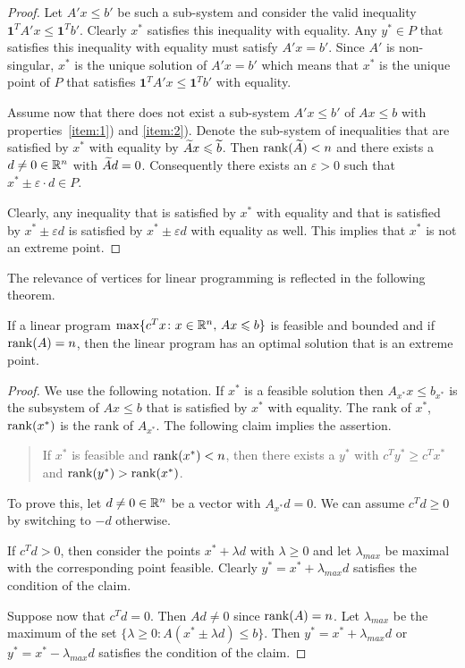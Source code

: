 \begin{proof}
  Let $A'x \leq b'$ be such a sub-system and consider the valid
  inequality $\mathbf{1}^T A' x \leq \mathbf{1}^T b'$.  Clearly $x^*$
  satisfies this inequality with equality. Any $y^* \in P$ that
  satisfies this inequality with equality must satisfy $A'x = b'$.
  Since $A'$ is non-singular, $x^*$ is the unique solution of $A'x =
  b'$ which means that $x^*$ is the unique point of $P$ that satisfies
  $\mathbf{1}^T A' x \leq \mathbf{1}^T b'$ with equality. 

  Assume now that there does not exist a sub-system $A'x \leq b'$ of
  $Ax \leq b$ with properties~\ref{item:1}) and \ref{item:2}). Denote
  the sub-system of inequalities that are satisfied by $x^*$ with
  equality by $\widetilde{A}x \leqslant \widetilde{b}$. Then $\mathrm{rank}(\widetilde{A}) < n$ and
  there exists a $d \neq 0 \in \mathbb{R}^n$ with $\widetilde{A}d = 0$. Consequently
  there exists an $\varepsilon >0$ such that $x^* \pm \varepsilon
  \cdot d \in P$.

  Clearly, any inequality that is satisfied by $x^*$ with equality and
  that is satisfied by $x^* \pm\varepsilon d$ is satisfied by $x^*
  \pm\varepsilon d$ with equality as well. This implies that $x^*$ is
  not an extreme point.
 
\end{proof}



The relevance of vertices for linear programming is reflected in the following theorem. 

\begin{theorem}
  \label{thr:2}
  If a linear program $\max\{c^Tx \colon x \in \mathbb{R}^n, \, Ax \leqslant b\}$
  is feasible and bounded and if $\mathrm{rank}(A) = n$, then the linear program has an optimal solution that is  an extreme point. 
\end{theorem}


\begin{proof}
  We use the following notation. If $x^*$ is a feasible solution then
  $A_{x^*} x \leq b_{x^*}$ is the subsystem of $Ax \leq b$ that is
  satisfied by $x^*$ with equality. The rank of $x^*$, $\mathrm{rank}(x^*)$ is
  the rank of $A_{x^*}$.  The following claim implies the assertion. 
  \begin{quote}
    If $x^*$ is feasible and $\mathrm{rank}(x^*) < n$, then there exists a
    $y^*$ with $c^T y^* \geq c^Tx^*$ and $\mathrm{rank}(y^*)>\mathrm{rank}(x^*)$.
  \end{quote}
  To prove this, let $d \neq 0 \in \mathbb{R}^n$ be a vector with $A_{x^*}d =
  0$.  We can assume $c^Td \geq 0$ by switching to $-d$ otherwise.

  If $c^Td >0$, then consider the points $x^* + \lambda d$ with
  $\lambda \geq 0$ and let $\lambda_{max}$ be maximal with the
  corresponding point feasible. Clearly $y^* = x^* + \lambda_{max} d$
  satisfies the condition of the claim. 

  Suppose now that  $c^T d = 0$. Then $A d \neq 0$ since $\mathrm{rank}(A) = n$. Let $\lambda_{max}$ be the maximum of the set $\{\lambda \geq 0 \colon A (x^* \pm \lambda d) \leq b\}$. Then $y^* = x^* + \lambda_{max}d$ or $y^* = x^* - \lambda_{max}d$  satisfies the condition of the claim. 
  
\end{proof}

